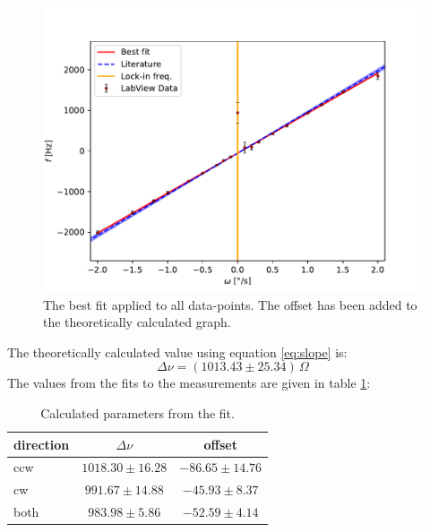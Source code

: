 \begin{figure}[h!]
    \centering
    \includegraphics[width=\textwidth]{Gyroscope/Report/plots/slope.pdf}
    \caption{The best fit applied to all data-points. The offset has been added to the theoretically calculated graph.}
    \label{fig:measurements}
\end{figure}
The theoretically calculated value using equation \ref{eq:slope} is:
$$\Delta \nu = (1013.43 \pm 25.34)\, \Omega $$
The values from the fits to the measurements are given in table \ref{tab:measurements}:
\begin{table}[h!]
\centering\begin{tabular}{l|c|c}
\hline direction & $\Delta \nu$ & offset \\ \hline
     ccw & $1018.30 \pm 16.28$ & $-86.65 \pm 14.76$\\
     cw & $991.67 \pm 14.88$ & $-45.93 \pm 8.37$ \\
     both & $983.98 \pm 5.86$ & $-52.59 \pm 4.14$
\end{tabular}
\caption{Calculated parameters from the fit.}
\label{tab:measurements}
\end{table}
